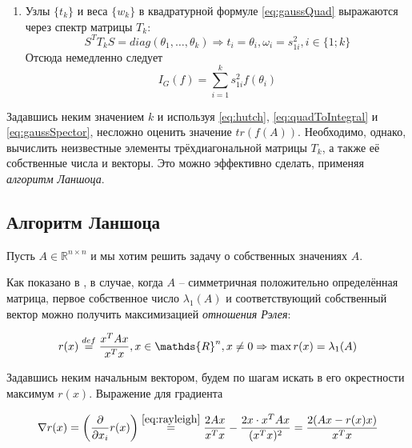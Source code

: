 \begin{enumerate}
\item Узлы $\{t_k\} $ и веса $ \{w_k\}$ в квадратурной формуле \eqref{eq:gaussQuad} выражаются через спектр матрицы $ T_k $:
\begin{equation}\label{eq:nodesCalculation}
    S^T T_k S = diag(\theta_1, \dots, \theta_k) \Rightarrow t_i = \theta_i, \omega_i = s_{1i}^2, i \in \{ 1;k \}
\end{equation}
Отсюда немедленно следует
\begin{equation}\label{eq:gaussSpector}
    \boxed{ I_G(f) = \sum_{i=1}^k s_{1i}^2 f(\theta_i) }
\end{equation}
\end{enumerate}

Задавшись неким значением $k$ и используя \eqref{eq:hutch}, \eqref{eq:quadToIntegral} и \eqref{eq:gaussSpector}, несложно оценить значение $ tr(f(A)) $.
Необходимо, однако, вычислить неизвестные элементы трёхдиагональной матрицы $ T_k $, а также её собственные числа и векторы.
Это можно эффективно сделать, применяя \emph{алгоритм Ланшоца}.

\subsection{Алгоритм Ланшоца}

Пусть $ A \in \mathds{R}^{n \times n} $ и мы хотим решить задачу о собственных значениях $ A $.

Как показано в \cite{golub2013matcomput}, в случае, когда $ A $ -- симметричная положительно определённая матрица, %
первое собственное число $ \lambda_1(A) $ и соответствующий собственный вектор можно получить максимизацией \emph{отношения Рэлея}:

\begin{equation}\label{eq:rayleigh}
    r(x) \defeq \frac{x^T A x}{x^T x}, x \in \mathds{R}^n, x \ne 0 \Rightarrow \max r(x) = \lambda_1(A)
\end{equation}

Задавшись неким начальным вектором, будем по шагам искать в его окрестности максимум $ r(x) $.
Выражение для градиента

\begin{equation}\label{eq:rayleighGrad}
    \nabla r(x) = \left( \frac{\partial}{\partial x_i} r(x) \right) \overset{\eqref{eq:rayleigh}}= \frac{2Ax}{x^Tx} - \frac{2x \cdot x^T Ax}{(x^Tx)^2} = \frac{2(Ax-r(x)x)}{x^Tx}
\end{equation}

